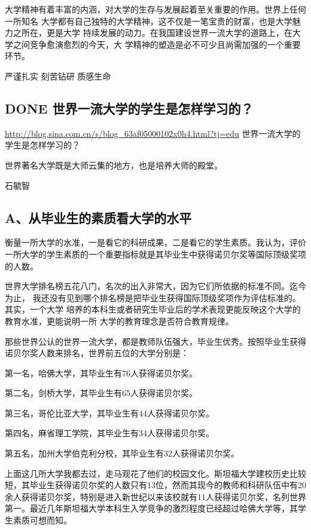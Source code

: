 \documentclass[11pt]{ctexart}
\begin{document}
{{{{大学精神有着丰富的内涵，对大学的生存与发展起着至关重要的作用。世界上任何一所知名
大学都有自己独特的大学精神，这不仅是一笔宝贵的财富，也是大学魅力之所在，更是大学
持续发展的动力。在我国建设世界一流大学的道路上，在大学之间竞争愈演愈烈的今天，大
学精神的塑造是必不可少且尚需加强的一个重要环节。


严谨扎实 刻苦钻研 质感生命


\subsection{{\bfseries\sffamily DONE} 世界一流大学的学生是怎样学习的？}
\label{sec:org7094900}
\url{http://blog.sina.com.cn/s/blog\_63af05000102x0h4.html?tj=edu}
世界一流大学的学生是怎样学习的？

世界著名大学既是大师云集的地方，也是培养大师的殿堂。

石毓智

\subsection{A、从毕业生的素质看大学的水平}
\label{sec:orgade10f6}

衡量一所大学的水准，一是看它的科研成果，二是看它的学生素质。我认为，评价
一所大学的学生素质的一个重要指标就是其毕业生中获得诺贝尔奖等国际顶级奖项
的人数。



世界大学排名榜五花八门，名次的出入非常大，因为它们所依据的标准不同。迄今为止，
我还没有见到哪个排名榜是把毕业生获得国际顶级奖项作为评估标准的。其实，一个大学
培养的本科生或者研究生毕业后的学术表现更能反映这个大学的教育水准，更能说明一所
大学的教育理念是否符合教育规律。


那些世界公认的世界一流大学，都是教师队伍强大，毕业生优秀。按照毕业生获得
诺贝尔奖人数来排名，世界前五位的大学分别是：




第一名，哈佛大学，其毕业生有76人获得诺贝尔奖。

第二名，剑桥大学，其毕业生有65人获得诺贝尔奖。

第三名，哥伦比亚大学，其毕业生有44人获得诺贝尔奖。

第四名，麻省理工学院，其毕业生有34人获得诺贝尔奖。

第五名，加州大学伯克利分校，其毕业生有32人获得诺贝尔奖。



上面这几所大学我都去过，走马观花了他们的校园文化。斯坦福大学建校历史比较
短，其毕业生获得诺贝尔奖的人数只有13位，然而其现今的教师和科研队伍中有20
余人获得诺贝尔奖，特别是进入新世纪以来该校就有11人获得诺贝尔奖，名列世界
第一。最近几年斯坦福大学本科生入学竞争的激烈程度已经超过哈佛大学等，其学
生素质可想而知。


}}}}
\end{document}
